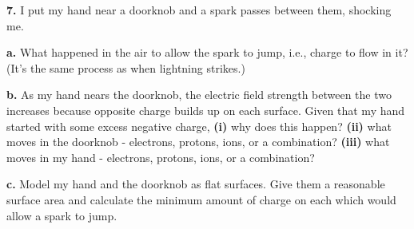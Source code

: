 \documentclass[12pt]{article}
\begin{document}
\textbf{7.} I put my hand near a doorknob and a spark passes between them, shocking me.

\textbf{a.}  What happened in the air to allow the spark to jump, i.e., charge to flow in it? (It's the same process as when lightning strikes.)

\textbf{b.} As my hand nears the doorknob, the electric field strength between the two increases because opposite charge builds up on each surface. Given that my hand started with some excess negative charge, \textbf{(i)} why does this happen? \textbf{(ii)} what moves in the doorknob - electrons, protons, ions, or a combination? \textbf{(iii)} what moves in my hand - electrons, protons, ions, or a combination?

\textbf{c.} Model my hand and the doorknob as flat surfaces. Give them a reasonable surface area and calculate the minimum amount of charge on each which would allow a spark to jump. 
\end{document}
